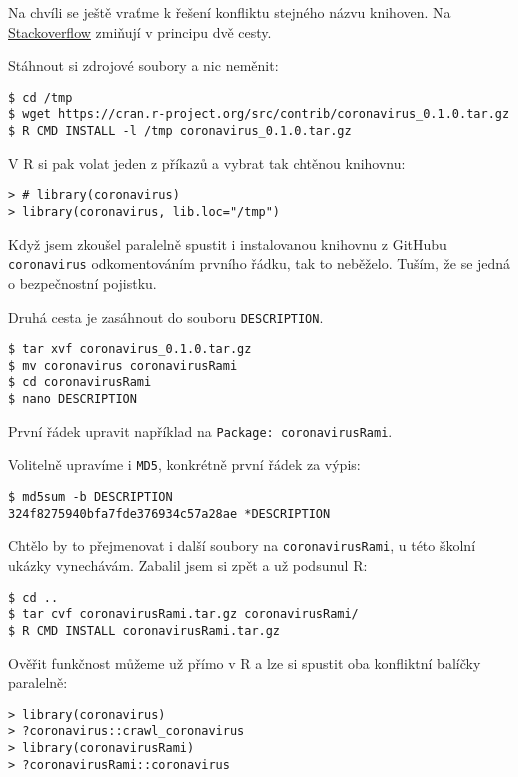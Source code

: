 Na chvíli se ještě vraťme k řešení konfliktu stejného názvu knihoven. Na \href{https://stackoverflow.com/questions/52447227/how-do-i-install-an-r-package-under-another-name}{Stackoverflow} zmiňují v principu dvě cesty.

Stáhnout si zdrojové soubory a nic neměnit:
\begin{lstlisting}
$ cd /tmp
$ wget https://cran.r-project.org/src/contrib/coronavirus_0.1.0.tar.gz
$ R CMD INSTALL -l /tmp coronavirus_0.1.0.tar.gz
\end{lstlisting}

V R si pak volat jeden z příkazů a vybrat tak chtěnou knihovnu:

\begin{lstlisting}
> # library(coronavirus)
> library(coronavirus, lib.loc="/tmp")
\end{lstlisting}

Když jsem zkoušel paralelně spustit i instalovanou knihovnu z GitHubu \texttt{coronavirus} odkomentováním prvního řádku, tak to neběželo. Tuším, že se jedná o bezpečnostní pojistku.

Druhá cesta je zasáhnout do souboru \texttt{DESCRIPTION}.
\begin{lstlisting}
$ tar xvf coronavirus_0.1.0.tar.gz
$ mv coronavirus coronavirusRami
$ cd coronavirusRami
$ nano DESCRIPTION
\end{lstlisting}

První řádek upravit například na
\texttt{Package: coronavirusRami}.  

Volitelně upravíme i \texttt{MD5}, konkrétně první řádek za výpis:
\begin{lstlisting}
$ md5sum -b DESCRIPTION
324f8275940bfa7fde376934c57a28ae *DESCRIPTION
\end{lstlisting}

Chtělo by to přejmenovat i další soubory na \texttt{coronavirusRami}, u této školní ukázky vynechávám. Zabalil jsem si zpět a už podsunul R:
\begin{lstlisting}
$ cd ..
$ tar cvf coronavirusRami.tar.gz coronavirusRami/
$ R CMD INSTALL coronavirusRami.tar.gz 
\end{lstlisting}

Ověřit funkčnost můžeme už přímo v R a lze si spustit oba konfliktní balíčky paralelně:
\begin{lstlisting}
> library(coronavirus)
> ?coronavirus::crawl_coronavirus
> library(coronavirusRami)
> ?coronavirusRami::coronavirus
\end{lstlisting}



